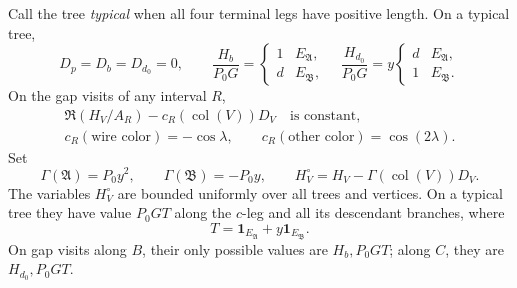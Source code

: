 \begin{lemma}
\label{four:marked}
Call the tree \emph{typical} when all four terminal legs have positive
length.  On a typical tree,
\begin{equation}
 D_p=D_b=D_{d_0}=0,\qquad
 \frac{H_b}{P_0G}=\begin{cases}1&E_{\mathfrak A},\\d&E_{\mathfrak B},\end{cases}
 \quad
 \frac{H_{d_0}}{P_0G}=y\begin{cases}d&E_{\mathfrak A},\\1&E_{\mathfrak B}.
 \end{cases}
 \label{four:marked-values}
\end{equation}
On the gap visits of any interval $R$,
\begin{equation}
 \begin{gathered}
 \Re(H_V/A_R)-c_R(\operatorname{col}(V))D_V
 \quad\text{is constant},\\
 c_R(\text{wire color})=-\cos\lambda,\qquad
 c_R(\text{other color})=\cos(2\lambda).
 \end{gathered}
 \label{four:line-invariant}
\end{equation}
Set
\begin{equation}
 \Gamma(\mathfrak A)=P_0y^2,\qquad
 \Gamma(\mathfrak B)=-P_0y,\qquad
 H_V^\circ=H_V-\Gamma(\operatorname{col}(V))D_V.
 \label{four:corrected}
\end{equation}
The variables $H_V^\circ$ are bounded uniformly over all trees and vertices.
On a typical tree they have value $P_0GT$ along the $c$-leg and all its
descendant branches, where
\begin{equation}
 T=\mathbf1_{E_{\mathfrak A}}+y\mathbf1_{E_{\mathfrak B}}.
 \label{four:T}
\end{equation}
On gap visits along $B$, their only possible values are $H_b,P_0GT$;
along $C$, they are $H_{d_0},P_0GT$.
\end{lemma}

